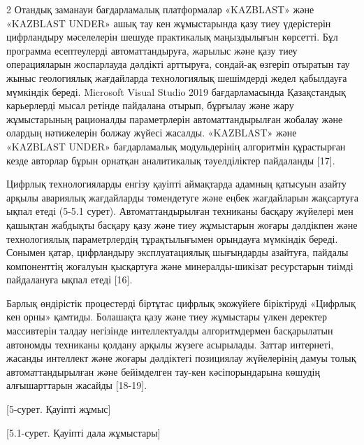 \begin{multicols}{2}
Отандық заманауи бағдарламалық платформалар «KAZBLAST» және «KAZBLAST
UNDER» ашық тау кен жұмыстарында қазу тиеу үдерістерін цифрландыру
мәселелерін шешуде практикалық маңыздылығын көрсетті. Бұл программа
есептеулерді автоматтандыруға, жарылыс және қазу тиеу операцияларын
жоспарлауда дәлдікті арттыруға, сондай-ақ өзгеріп отыратын тау жыныс
геологиялық жағдайларда технологиялық шешімдерді жедел қабылдауға
мүмкіндік береді. Microsoft Visual Studio 2019 бағдарламасында
Қазақстандық карьерлерді мысал ретінде пайдалана отырып, бұрғылау және
жару жұмыстарының рационалды параметрлерін автоматтандырылған жобалау
және олардың нәтижелерін болжау жүйесі жасалды. «KAZBLAST» және
«KAZBLAST UNDER» бағдарламалық модульдерінің алгоритмін құрастырған
кезде авторлар бұрын орнатқан аналитикалық тәуелділіктер пайдаланды
{[}17{]}.

Цифрлық технологияларды енгізу қауіпті аймақтарда адамның қатысуын
азайту арқылы авариялық жағдайларды төмендетуге және еңбек жағдайларын
жақсартуға ықпал етеді (5-5.1 сурет). Автоматтандырылған техниканы
басқару жүйелері мен қашықтан жабдықты басқару қазу және тиеу жұмыстарын
жоғары дәлдікпен және технологиялық параметрлердің тұрақтылығымен
орындауға мүмкіндік береді. Сонымен қатар, цифрландыру эксплуатациялық
шығындарды азайтуға, пайдалы компоненттің жоғалуын қысқартуға және
минералды-шикізат ресурстарын тиімді пайдалануға ықпал етеді {[}16{]}.

Барлық өндірістік процестерді біртұтас цифрлық экожүйеге біріктіруді
«Цифрлық кен орны» қамтиды. Болашақта қазу және тиеу жұмыстары үлкен
деректер массивтерін талдау негізінде интеллектуалды алгоритмдермен
басқарылатын автономды техниканы қолдану арқылы жүзеге асырылады. Заттар
интернеті, жасанды интеллект және жоғары дәлдіктегі позициялау
жүйелерінің дамуы толық автоматтандырылған және бейімделген тау-кен
кәсіпорындарына көшудің алғышарттарын жасайды {[}18-19{]}.

[5-сурет. Қауіпті жұмыс]
\end{multicols}

[5.1-сурет. Қауіпті дала жұмыстары]

